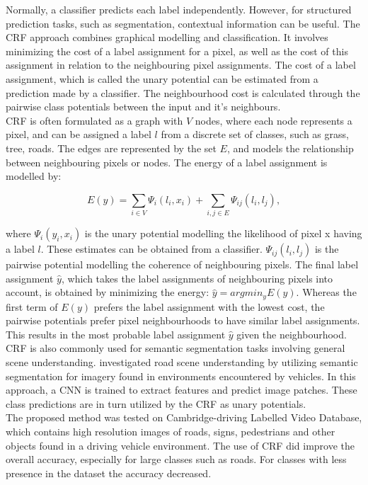 Normally, a classifier predicts each label independently. However, for structured prediction tasks, such as segmentation, contextual information can be useful. The \ac{CRF} approach combines graphical modelling and classification. It involves minimizing the cost of a label assignment for a pixel, as well as the cost of this assignment in relation to the neighbouring pixel assignments. The cost of a label assignment, which is called the unary potential can be estimated from a prediction made by a classifier. The neighbourhood cost is calculated through the pairwise class potentials between the input and it's neighbours.\\

\ac{CRF} is often formulated as a graph with $V$ nodes, where each node represents a pixel, and can be assigned a label $l$ from a discrete set of classes, such as grass, tree, roads. The edges are represented by the set $E$, and models the relationship between neighbouring pixels or nodes. The energy of a label assignment is modelled by:

$$E(y) = \sum\limits_{i\in V} \Psi_i(l_i, x_i) + \sum\limits_{i,j\in E}\Psi_{ij}(l_i, l_j),$$

where $\Psi_i(y_i, x_i)$ is the unary potential modelling the likelihood of pixel x having a label $l$. These estimates can be obtained from a classifier.  $\Psi_{ij}(l_i, l_j)$ is the pairwise potential modelling the coherence of neighbouring pixels. The final label assignment $\hat{y}$, which takes the label assignments of neighbouring pixels into account, is obtained by minimizing the energy:  $\hat{y} =argmin_y E(y)$. Whereas the first term of $E(y)$ prefers the label assignment with the lowest cost, the pairwise potentials prefer pixel neighbourhoods to have similar label assignments. This results in the most probable label assignment $\hat{y}$ given the neighbourhood.\\

\ac{CRF} is also commonly used for semantic segmentation tasks involving general scene understanding. \cite{LeCun_semantic} investigated road scene understanding by utilizing semantic segmentation for imagery found in environments encountered by vehicles. In this approach, a \ac{CNN} is trained to extract features and predict image patches. These class predictions are in turn utilized by the \ac{CRF} as unary potentials.\\

The proposed method was tested on Cambridge-driving Labelled Video Database, which contains high resolution images of roads, signs, pedestrians and other objects found in a driving vehicle environment. The use of \ac{CRF} did improve the overall accuracy, especially for large classes such as roads. For classes with less presence in the dataset the accuracy decreased.\\

